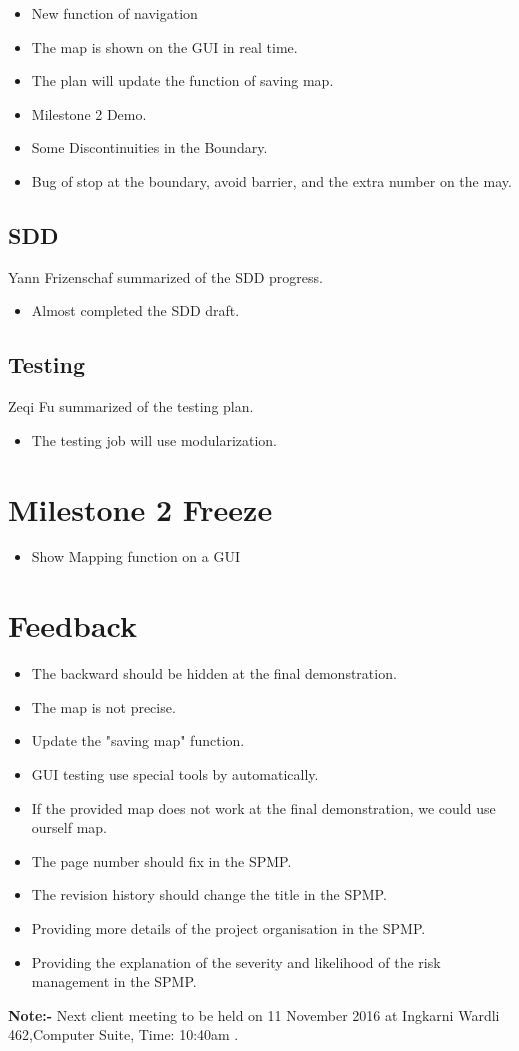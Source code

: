 \documentclass[11pt, a4paper]{article}
\begin{document}
\begin{itemize}
\item New function of navigation
\item The map is shown on the GUI in real time.
\item The plan will update the function of saving map.
\item Milestone 2 Demo.
\item Some Discontinuities in the Boundary.
\item Bug of stop at the boundary, avoid barrier, and the extra number on the may.
\end{itemize}

\subsection{SDD}
Yann Frizenschaf summarized of the SDD progress.
\begin{itemize}
\item Almost completed the SDD draft.
\end{itemize}

\subsection{Testing}
Zeqi Fu summarized of the testing plan.
\begin{itemize}
\item The testing job will use modularization.
\end{itemize}



\section{Milestone 2 Freeze}
\begin{itemize}
\item Show Mapping function on a GUI

\end{itemize}
\section{Feedback}
\begin{itemize}
\item The backward should be hidden at the final demonstration.
\item The map is not precise.
\item Update the "saving map" function.
\item GUI testing use special tools by automatically.
\item If the provided map does not work at the final demonstration, we could use ourself map.
\item The page number should fix in the SPMP.
\item The revision history should change the title in the SPMP.
\item Providing more details of the project organisation in the SPMP. 
\item Providing the explanation of the severity and likelihood of the risk management in the SPMP.
\end{itemize}

\vspace*{20pt}
\noindent  \textbf{Note:-} Next client meeting to be held on 11 November 2016 at Ingkarni Wardli 462,Computer Suite, Time: 10:40am .
\end{document}
